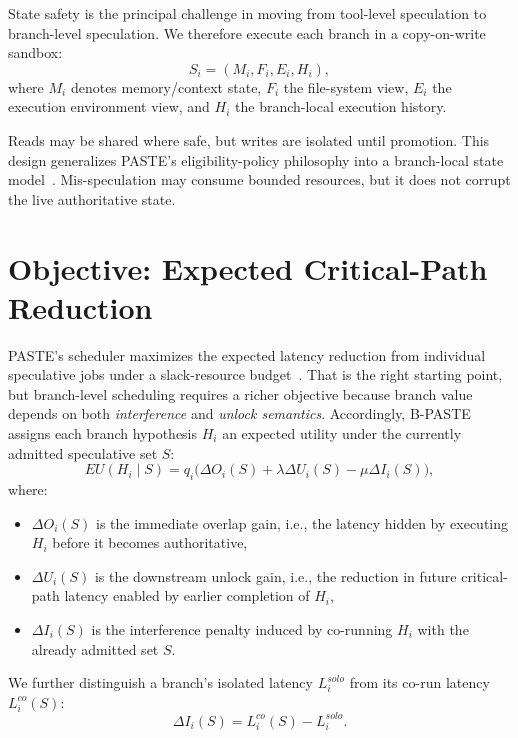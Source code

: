 \documentclass[10pt,twocolumn]{article}
\begin{document}
State safety is the principal challenge in moving from tool-level speculation to branch-level speculation. We therefore execute each branch in a copy-on-write sandbox:
\begin{equation}
S_i = (M_i, F_i, E_i, H_i),
\end{equation}
where $M_i$ denotes memory/context state, $F_i$ the file-system view, $E_i$ the execution environment view, and $H_i$ the branch-local execution history.

Reads may be shared where safe, but writes are isolated until promotion. This design generalizes PASTE's eligibility-policy philosophy into a branch-local state model~\cite{paste}. Mis-speculation may consume bounded resources, but it does not corrupt the live authoritative state.

\section{Objective: Expected Critical-Path Reduction}

PASTE's scheduler maximizes the expected latency reduction from individual speculative jobs under a slack-resource budget~\cite{paste}. That is the right starting point, but branch-level scheduling requires a richer objective because branch value depends on both \emph{interference} and \emph{unlock semantics}. Accordingly, B-PASTE assigns each branch hypothesis $H_i$ an expected utility under the currently admitted speculative set $S$:
\begin{equation}
EU(H_i \mid S) = q_i \Big(\Delta O_i(S) + \lambda \Delta U_i(S) - \mu \Delta I_i(S)\Big),
\end{equation}
where:
\begin{itemize}[leftmargin=1.5em]
    \item $\Delta O_i(S)$ is the immediate overlap gain, i.e., the latency hidden by executing $H_i$ before it becomes authoritative,
    \item $\Delta U_i(S)$ is the downstream unlock gain, i.e., the reduction in future critical-path latency enabled by earlier completion of $H_i$,
    \item $\Delta I_i(S)$ is the interference penalty induced by co-running $H_i$ with the already admitted set $S$.
\end{itemize}

We further distinguish a branch's isolated latency $L_i^{solo}$ from its co-run latency $L_i^{co}(S)$:
\begin{equation}
\Delta I_i(S) = L_i^{co}(S) - L_i^{solo}.
\end{equation}
\end{document}

